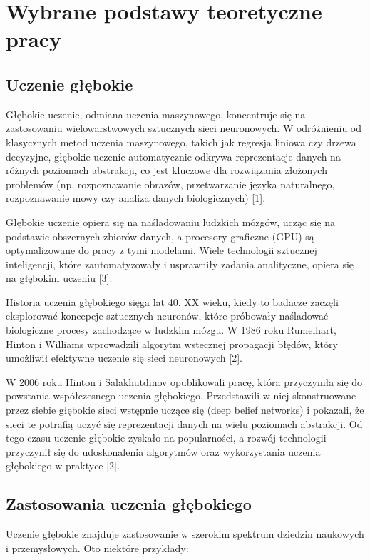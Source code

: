 \chapter{Wybrane podstawy teoretyczne pracy}

\section{Uczenie głębokie}

Głębokie uczenie, odmiana uczenia maszynowego, koncentruje się na zastosowaniu wielowarstwowych sztucznych sieci neuronowych. W odróżnieniu od klasycznych metod uczenia maszynowego, takich jak regresja liniowa czy drzewa decyzyjne, głębokie uczenie automatycznie odkrywa reprezentacje danych na różnych poziomach abstrakcji, co jest kluczowe dla rozwiązania złożonych problemów (np. rozpoznawanie obrazów, przetwarzanie języka naturalnego, rozpoznawanie mowy czy analiza danych biologicznych) [1]. 

Głębokie uczenie opiera się na naśladowaniu ludzkich mózgów, ucząc się na podstawie obszernych zbiorów danych, a procesory graficzne (GPU) są optymalizowane do pracy z tymi modelami. Wiele technologii sztucznej inteligencji, które zautomatyzowały i usprawniły zadania analityczne, opiera się na głębokim uczeniu [3].

Historia uczenia głębokiego sięga lat 40. XX wieku, kiedy to badacze zaczęli eksplorować koncepcje sztucznych neuronów, które próbowały naśladować biologiczne procesy zachodzące w ludzkim mózgu. W 1986 roku Rumelhart, Hinton i Williams wprowadzili algorytm wstecznej propagacji błędów, który umożliwił efektywne uczenie się sieci neuronowych [2].

W 2006 roku Hinton i Salakhutdinov opublikowali pracę, która przyczyniła się do powstania współczesnego uczenia głębokiego. Przedstawili w niej skonstruowane przez siebie głębokie sieci wstępnie uczące się (deep belief networks) i pokazali, że sieci te potrafią uczyć się reprezentacji danych na wielu poziomach abstrakcji. Od tego czasu uczenie głębokie zyskało na popularności, a rozwój technologii przyczynił się do udoskonalenia algorytmów oraz wykorzystania uczenia głębokiego w praktyce [2].

\section{Zastosowania uczenia głębokiego}
Uczenie głębokie znajduje zastosowanie w szerokim spektrum dziedzin naukowych i przemysłowych. Oto niektóre przykłady:

